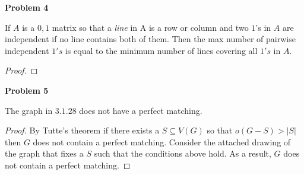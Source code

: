 \documentclass{article}
\newenvironment{claim}[2][Claim]{\begin{trivlist}
		\item[\hskip \labelsep {\bfseries #1}\hskip \labelsep {\bfseries #2}]}{\end{trivlist}}
\begin{document}
\noindent \textbf{Problem 4}
\begin{claim}{}
If $A$ is a $0, 1$ matrix so that a \textit{line} in A is a row or column and two $1$'s in $A$ are independent if no line contains both of them. Then the max number of pairwise independent $1's$ is equal to the minimum number of lines covering all $1's$ in $A$.
\end{claim}
\begin{proof}

\end{proof}

\noindent \textbf{Problem 5}
\begin{claim}{}
The graph in $3.1.28$ does not have a perfect matching.
\end{claim}
\begin{proof}
By Tutte's theorem if there exists a $S \subseteq V(G)$ so that $o(G - S) > |S|$ then $G$ does not contain a perfect matching. Consider the attached drawing of the graph that fixes a $S$ such that the conditions above hold. As a result, $G$ does not contain a perfect matching.
\end{proof}
\end{document}
